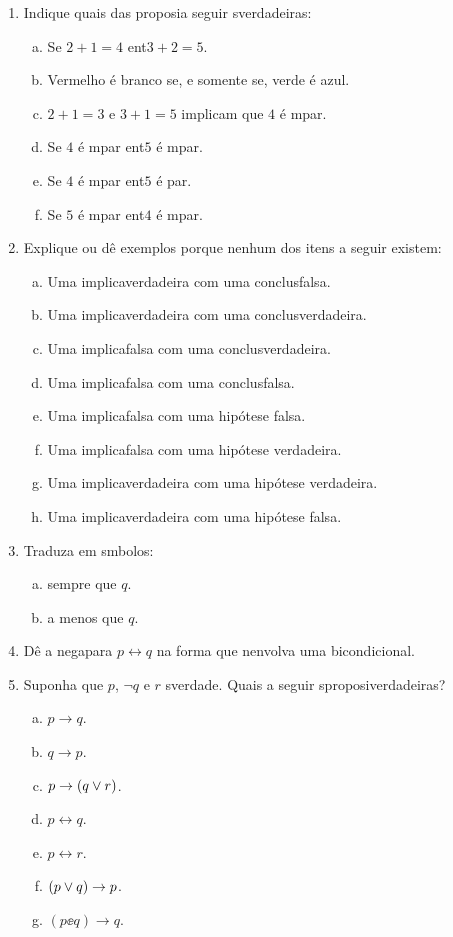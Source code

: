 \begin{enumerate}[{\bf 1.}]
\item Indique quais das proposi\coes a seguir s\ao verdadeiras:
\begin{enumerate}[a)]
\item Se $2+1=4$ ent\ao $3+2=5$.
\item Vermelho \'e branco se, e somente se, verde \'e azul.
\item $2+1=3$ e $3+1=5$ implicam que $4$ \'e \ih mpar.
\item Se $4$ \'e \ih mpar ent\ao $5$ \'e \ih mpar.
\item Se $4$ \'e \ih mpar ent\ao $5$ \'e par.
\item Se $5$ \'e \ih mpar ent\ao $4$ \'e \ih mpar. 
\end{enumerate}

\item Explique ou d\^e exemplos porque nenhum dos itens a seguir existem:
\begin{enumerate}[a)]
\item Uma implica\cao verdadeira com uma conclus\ao falsa.
\item Uma implica\cao verdadeira com uma conclus\ao verdadeira.
\item Uma implica\cao falsa com uma conclus\ao verdadeira.
\item Uma implica\cao falsa com uma conclus\ao falsa.
\item Uma implica\cao falsa com uma hip\'otese falsa.
\item Uma implica\cao falsa com uma hip\'otese verdadeira.
\item Uma implica\cao verdadeira com uma hip\'otese verdadeira.
\item Uma implica\cao verdadeira com uma hip\'otese falsa. 
\end{enumerate}

\item Traduza em s\ih mbolos:
\begin{enumerate}[a)]
\item \pp sempre que $q$.
\item \pp a menos que $q$.
\end{enumerate}

\item D\^e a nega\cao para $p \leftrightarrow q$ na forma que n\ao envolva uma bicondicional.

\item Suponha que $p$, $\lnot q$ e $r$ s\ao verdade. Quais a seguir s\ao proposi\coes verdadeiras?
\begin{enumerate}[a)]
\item $p \to q$.
\item $q \to p$.
\item $p \to (q \vee r)$.
\item $p \leftrightarrow q$.
\item $p \leftrightarrow r$.
\item $(p \vee q) \to p$.
\item $(p \ee q) \to q$.
\end{enumerate}


\end{enumerate}
